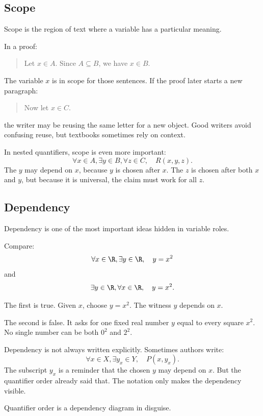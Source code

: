 \subsection{Scope}

Scope is the region of text where a variable has a particular meaning.

In a proof:

\begin{quote}
Let $x\in A$. Since $A\subseteq B$, we have $x\in B$.
\end{quote}

The variable $x$ is in scope for those sentences. If the proof later starts a new paragraph:

\begin{quote}
Now let $x\in C$.
\end{quote}

the writer may be reusing the same letter for a new object. Good writers avoid confusing reuse, but textbooks sometimes rely on context.

In nested quantifiers, scope is even more important:
\[
\forall x\in A,\exists y\in B,\forall z\in C,\quad R(x,y,z).
\]
The $y$ may depend on $x$, because $y$ is chosen after $x$. The $z$ is chosen after both $x$ and $y$, but because it is universal, the claim must work for all $z$.

\subsection{Dependency}

Dependency is one of the most important ideas hidden in variable roles.

Compare:
\[
\forall x\in\R,\exists y\in\R,\quad y=x^2
\]
and
\[
\exists y\in\R,\forall x\in\R,\quad y=x^2.
\]

The first is true. Given $x$, choose $y=x^2$. The witness $y$ depends on $x$.

The second is false. It asks for one fixed real number $y$ equal to every square $x^2$. No single number can be both $0^2$ and $2^2$.

Dependency is not always written explicitly. Sometimes authors write:
\[
\forall x\in X,\exists y_x\in Y,\quad P(x,y_x).
\]
The subscript $y_x$ is a reminder that the chosen $y$ may depend on $x$. But the quantifier order already said that. The notation only makes the dependency visible.

\begin{intuitionbox}
Quantifier order is a dependency diagram in disguise.
\end{intuitionbox}

